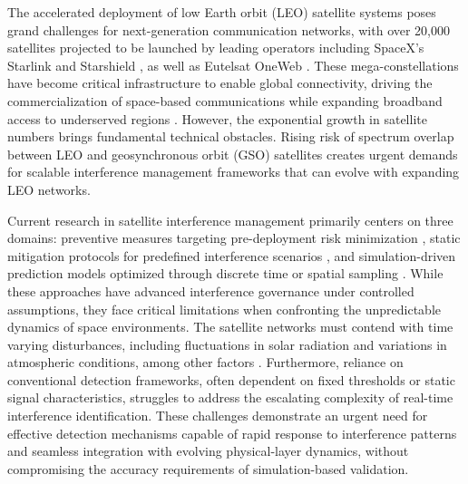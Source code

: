 \documentclass[conference]{IEEEtran}
\begin{document}
The accelerated deployment of low Earth orbit (LEO) satellite systems poses grand challenges for next-generation communication networks, with over 20,000 satellites projected to be launched by leading operators including SpaceX's Starlink\cite{starlink} and Starshield \cite{spacex_starshield}, as well as Eutelsat OneWeb \cite{oneweb}. These mega-constellations have become critical infrastructure to enable global connectivity, driving the commercialization of space-based communications while expanding broadband access to underserved regions \cite{reddyLowEarthOrbit2023}. However, the exponential growth in satellite numbers brings fundamental technical obstacles. Rising risk of spectrum overlap between LEO and geosynchronous orbit (GSO) satellites creates urgent demands for scalable interference management frameworks that can evolve with expanding LEO networks.

Current research in satellite interference management primarily centers on three domains: preventive measures targeting pre-deployment risk minimization \cite{sharmaInlineInterferenceMitigation2016, liOptimalBeamPower2019}, static mitigation protocols for predefined interference scenarios \cite{wangCoFrequencyInterferenceAnalysis2020, zhangSpectralCoexistenceLEO2018}, and simulation-driven prediction models optimized through discrete time or spatial sampling \cite{wangCoFrequencyInterferenceAnalysis2020}. While these approaches have advanced interference governance under controlled assumptions, they face critical limitations when confronting the unpredictable dynamics of space environments. The satellite networks must contend with time varying disturbances, including fluctuations in solar radiation and variations in atmospheric conditions, among other factors \cite{facskoSpaceWeatherEffects2023}. Furthermore, reliance on conventional detection frameworks, often dependent on fixed thresholds or static signal characteristics, struggles to address the escalating complexity of real-time interference identification. These challenges demonstrate an urgent need for effective detection mechanisms capable of rapid response to interference patterns and seamless integration with evolving physical-layer dynamics, without compromising the accuracy requirements of simulation-based validation.
\end{document}

